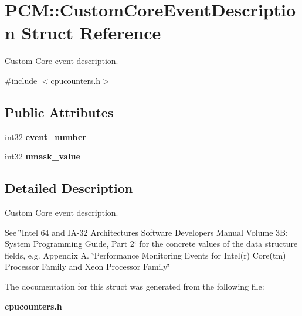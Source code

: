 \section{P\+CM\+:\+:Custom\+Core\+Event\+Description Struct Reference}
\label{structPCM_1_1CustomCoreEventDescription}


Custom Core event description.  




{\ttfamily \#include $<$cpucounters.\+h$>$}

\subsection*{Public Attributes}
\begin{DoxyCompactItemize}
\item 
int32 {\bfseries event\+\_\+number}\label{structPCM_1_1CustomCoreEventDescription_adfdbff9cf7c5be78450884b7adbd48fb}

\item 
int32 {\bfseries umask\+\_\+value}\label{structPCM_1_1CustomCoreEventDescription_a317a16603c27cf815fa62d88e7fd2f61}

\end{DoxyCompactItemize}


\subsection{Detailed Description}
Custom Core event description. 

See \char`\"{}\+Intel 64 and I\+A-\/32 Architectures Software Developers Manual Volume 3\+B\+:
\+System Programming Guide, Part 2\char`\"{} for the concrete values of the data structure fields, e.\+g. Appendix A. \char`\"{}\+Performance Monitoring Events for Intel(r) Core(tm) Processor Family
and Xeon Processor Family\char`\"{} 

The documentation for this struct was generated from the following file\+:\begin{DoxyCompactItemize}
\item 
{\bf cpucounters.\+h}\end{DoxyCompactItemize}
